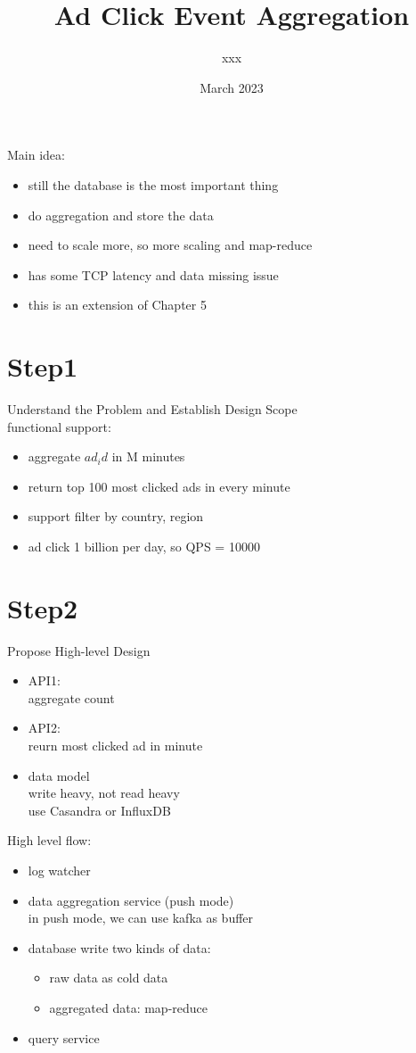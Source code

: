 \documentclass{article}
\title{Ad Click Event Aggregation}
\author{xxx}
\date{March 2023}
\begin{document}
\maketitle
Main idea:\\
\begin{itemize}
    \item still the database is the most important thing
    \item do aggregation and store the data
    \item need to scale more, so more scaling and map-reduce
    \item has some TCP latency and data missing issue
    \item this is an extension of Chapter 5
\end{itemize}
\section{Step1}
Understand the Problem and Establish Design Scope\\
functional support:\\
\begin{itemize}
    \item aggregate $ad_id$ in M minutes
    \item return top 100 most clicked ads in every minute
    \item support filter by country, region
    \item ad click 1 billion per day, so QPS = 10000
\end{itemize}
\section{Step2}
Propose High-level Design\\
\begin{itemize}
    \item API1:\\
    aggregate count
    \item API2:\\
    reurn most clicked ad in minute
    \item data model\\
    write heavy, not read heavy\\
    use Casandra or InfluxDB
\end{itemize}
High level flow:\\
\begin{itemize}
    \item log watcher
    \item data aggregation service (push mode)\\
    in push mode, we can use kafka as buffer
    \item database
    write two kinds of data:
    \begin{itemize}
        \item raw data as cold data
        \item aggregated data: map-reduce
    \end{itemize}
    \item query service
\end{itemize}
\end{document}
